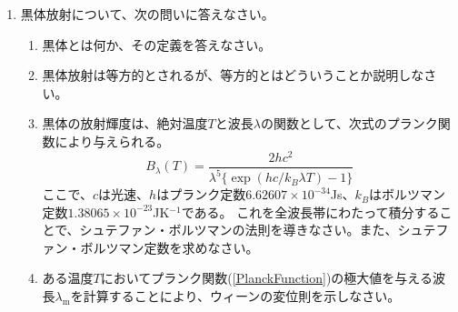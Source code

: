 \documentclass{jsarticle}
\newenvironment{problems}
{
  \renewcommand\labelenumi{\doublebox{\arabic{enumi}}}
  \begin{enumerate}
}{
  \end{enumerate}
  \renewcommand\labelenumi{\arabic{enumi}.}
}
\begin{document}
\begin{problems}
    \item 黒体放射について、次の問いに答えなさい。
        \begin{enumerate}[(1)]
        \item 黒体とは何か、その定義を答えなさい。
        \item 黒体放射は等方的とされるが、等方的とはどういうことか説明しなさい。
        \item 黒体の放射輝度は、絶対温度$T$と波長$\lambda$の関数として、次式のプランク関数により与えられる。
        \begin{equation}
        B_{\lambda}(T)=\frac{2hc^2}{\lambda^5\{\exp(hc/k_B\lambda T)-1\}} \label{PlanckFunction}
        \end{equation}
        ここで、$c$は光速、$h$はプランク定数$6.62607\times 10^{-34}$Js、$k_B$はボルツマン定数$1.38065\times 10^{-23}$JK$^{-1}$である。
        これを全波長帯にわたって積分することで、シュテファン・ボルツマンの法則を導きなさい。また、シュテファン・ボルツマン定数を求めなさい。
        \item ある温度$T$においてプランク関数(\ref{PlanckFunction})の極大値を与える波長$\lambda _\mathrm{m}$を計算することにより、ウィーンの変位則を示しなさい。
        \end{enumerate}
\end{problems}
\end{document}
